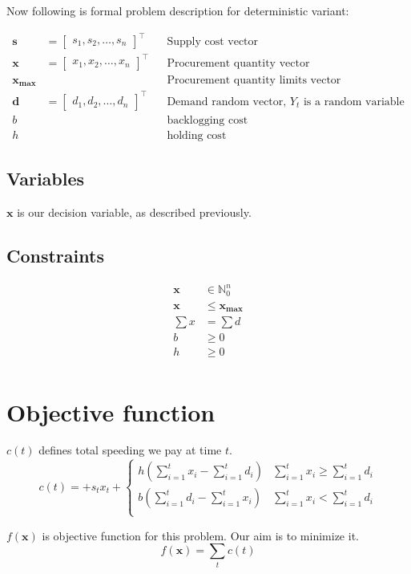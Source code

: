 Now following is formal problem description for deterministic variant:

\begin{align*}
    \mathbf{s} &= \begin{bmatrix}
        s_1, s_2, \dotsc, s_n
    \end{bmatrix}^\intercal && \text{Supply cost vector} \\
    \mathbf{x} &= \begin{bmatrix}
        x_1, x_2, \dotsc, x_n
    \end{bmatrix}^\intercal && \text{Procurement quantity vector} \\
    \mathbf{x_{\max}}  & && \text{Procurement quantity limits vector} \\
    \mathbf{d} &= \begin{bmatrix}
        d_1, d_2, \dotsc, d_n
    \end{bmatrix}^\intercal && \text{Demand random vector, $Y_t$ is a random variable} \\
    b & && \text{backlogging cost} \\
    h & && \text{holding cost}
\end{align*}

\subsection{Variables}
\label{sub:Variables}
$\mathbf{x}$ is our decision variable, as described previously.
\subsection{Constraints}
\label{sub:Constraints}
\begin{align*}
    \mathbf{x} &\in \mathbb{N}_0^n \\
    \mathbf{x} &\le \mathbf{x_{\text{max}}}\\
    \sum{x} &= \sum{d} \\
    b &\ge 0\\
    h &\ge 0\\
\end{align*}

\section{Objective function}

\begin{definition}{$c(t)$}
defines total speeding we pay at time $t$.
    \begin{equation}
        \label{eq:cost-t}
        c(t) = + s_t x_t + \begin{cases}
        h \left( \sum_{i=1}^t{x_i} - \sum_{i=1}^t{d_i} \right)  &
            \sum_{i=1}^t{x_i} \ge \sum_{i=1}^t{d_i}  \\
        b \left(\sum_{i=1}^t{d_i} - \sum_{i=1}^t{x_i} \right) &
            \sum_{i=1}^t{x_i} < \sum_{i=1}^t{d_i} \\
        \end{cases}
    \end{equation}
\end{definition}

\begin{definition}{$f(\mathbf{x})$}
    is objective function for this problem. Our aim is to minimize it.
    \begin{equation}
        f(\mathbf{x}) =  \sum_t{c(t)}
        \label{eq:cost-f}
    \end{equation}
\end{definition}
